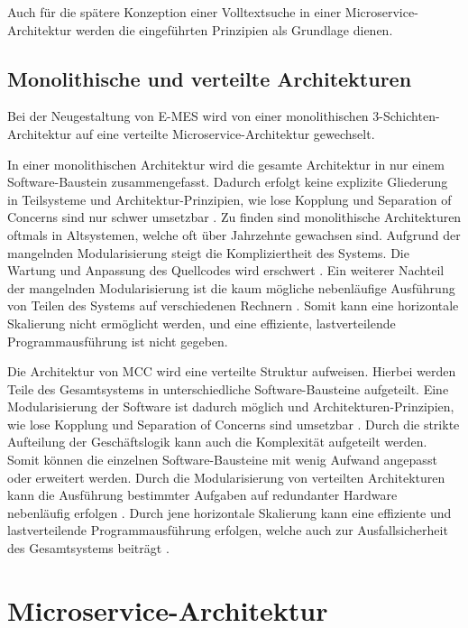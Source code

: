 Auch für die spätere Konzeption einer Volltextsuche in einer Microservice-Architektur werden die eingeführten Prinzipien als Grundlage dienen.

\subsection{Monolithische und verteilte Architekturen\label{subsec2.1.2:Unterunterpunkt-2}}

Bei der Neugestaltung von E-MES wird von einer monolithischen 3-Schichten-Architektur auf eine verteilte Microservice-Architektur gewechselt.

In einer monolithischen Architektur wird die gesamte Architektur in nur einem Software-Baustein zusammengefasst. Dadurch erfolgt keine explizite Gliederung in Teilsysteme und Architektur-Prinzipien, wie lose Kopplung und Separation of Concerns sind nur schwer umsetzbar \cite[S. 216]{Vogel.2009}. Zu finden sind monolithische Architekturen oftmals in Altsystemen, welche oft über Jahrzehnte gewachsen sind. Aufgrund der mangelnden Modularisierung steigt die Kompliziertheit des Systems. Die Wartung und Anpassung des Quellcodes wird erschwert \cite{Prof.Dr.AndreasFink.2012b}. Ein weiterer Nachteil der mangelnden Modularisierung ist die kaum mögliche nebenläufige Ausführung von Teilen des Systems auf verschiedenen Rechnern \cite{Prof.Dr.AndreasFink.2012b}. Somit kann eine horizontale Skalierung nicht ermöglicht werden, und eine effiziente, lastverteilende Programmausführung ist nicht gegeben.

Die Architektur von MCC wird eine verteilte Struktur aufweisen. Hierbei werden Teile des Gesamtsystems in unterschiedliche Software-Bausteine aufgeteilt. Eine Modularisierung der Software ist dadurch möglich und Architekturen-Prinzipien, wie lose Kopplung und Separation of Concerns sind umsetzbar \cite{Vogel.2009}. Durch die strikte Aufteilung der Geschäftslogik kann auch die Komplexität aufgeteilt werden. Somit können die einzelnen Software-Bausteine mit wenig Aufwand angepasst oder erweitert werden. Durch die Modularisierung von verteilten Architekturen kann die Ausführung bestimmter Aufgaben auf redundanter Hardware nebenläufig erfolgen \cite{Prof.Dr.AndreasFink.2012}. Durch jene horizontale Skalierung kann eine effiziente und lastverteilende Programmausführung erfolgen, welche auch zur Ausfallsicherheit des Gesamtsystems beiträgt \cite{Prof.Dr.AndreasFink.2012}.

\section{Microservice-Architektur\label{sec2.2:Unterpunkt-2}}

